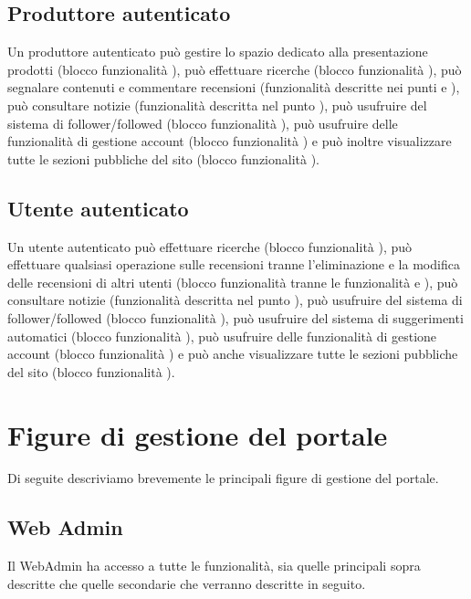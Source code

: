 \subsection{Produttore autenticato}
Un produttore autenticato può gestire lo spazio dedicato alla presentazione prodotti (blocco funzionalità ), può effettuare ricerche (blocco funzionalità ), può segnalare contenuti e commentare recensioni (funzionalità descritte nei punti  e ), può consultare notizie (funzionalità descritta nel punto ), può usufruire del sistema di follower/followed (blocco funzionalità ), può usufruire delle funzionalità di gestione account (blocco funzionalità ) e può inoltre visualizzare tutte le sezioni pubbliche del sito (blocco funzionalità ).

\subsection{Utente autenticato}
Un utente autenticato può effettuare ricerche (blocco funzionalità ), può effettuare qualsiasi operazione sulle recensioni tranne l’eliminazione e la modifica delle recensioni di altri utenti (blocco funzionalità  tranne le funzionalità  e ),  può consultare notizie (funzionalità descritta nel punto ), può usufruire del sistema di follower/followed  (blocco funzionalità ), può usufruire del sistema di suggerimenti automatici  (blocco funzionalità ), può usufruire delle funzionalità di gestione account (blocco funzionalità ) e può anche visualizzare tutte le sezioni pubbliche del sito  (blocco funzionalità ).

\section{Figure di gestione del portale}
Di seguite descriviamo brevemente le principali figure di gestione del portale.

\subsection{Web Admin}
Il WebAdmin ha accesso a tutte le funzionalità, sia quelle principali sopra descritte che quelle secondarie che verranno descritte in seguito.

